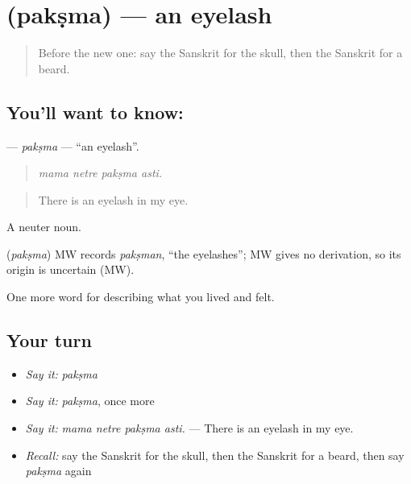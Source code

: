 \section[\texorpdfstring{\sk{पक्ष्म} (pakṣma)}{पक्ष्म (pakṣma)}]{ (pakṣma) — an eyelash}

\label{lesson:SA-C471-paksma}



\begin{quote}
Before the new one: say the Sanskrit for the skull, then the Sanskrit for a beard.
\end{quote}

\subsection*{You'll want to know: }
\textbf{} — \emph{pakṣma} — \textquotedblleft{}an eyelash\textquotedblright{}.

\begin{quote}
   
\end{quote}

\begin{quote}
\emph{mama netre pakṣma asti.}
\end{quote}

\begin{quote}
There is an eyelash in my eye.
\end{quote}

A neuter noun.

\begin{cousinweb}
\textbf{} (\emph{pakṣma}) MW records \emph{pakṣman}, \textquotedblleft{}the eyelashes\textquotedblright{}; MW gives no derivation, so its origin is uncertain (MW).
\end{cousinweb}

\begin{grammarlens}[title={What you've built}]
One more word for describing what you lived and felt.
\end{grammarlens}

\subsection*{Your turn}
\begin{itemize}
\raggedright
  \item \emph{Say it:} \emph{pakṣma}
  \item \emph{Say it:} \emph{pakṣma}, once more
  \item \emph{Say it:} \emph{mama netre pakṣma asti.} — There is an eyelash in my eye.
  \item \emph{Recall:} say the Sanskrit for the skull, then the Sanskrit for a beard, then say \emph{pakṣma} again
\end{itemize}

